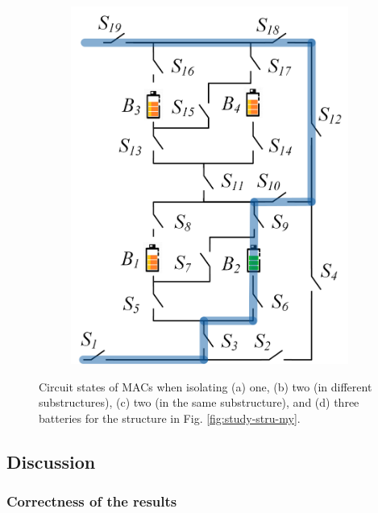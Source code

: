 \documentclass{article}
\begin{document}
\begin{figure}[htbp]
\begin{subfigure}[b]{0.31\textwidth}
        \includegraphics[width=\textwidth]{e2f2-isolate-3.png}
        \caption{}
        \label{fig:my-isolated-3}
    \end{subfigure}
    \caption{
        Circuit states of MACs when isolating (a) one, (b) two (in different substructures), (c) two (in the same substructure), and (d) three batteries for the structure in Fig. \ref{fig:study-stru-my}.
        }
\end{figure}

\subsection{Discussion}

\subsubsection{Correctness of the results}
\end{document}
